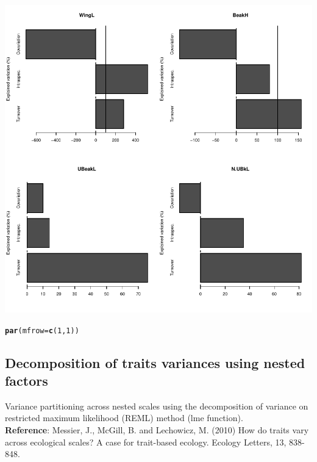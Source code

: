 \documentclass[12pt]{article}\usepackage[]{graphicx}\usepackage[]{color}
\makeatletter
\def\maxwidth{ %
  \ifdim\Gin@nat@width>\linewidth
    \linewidth
  \else
    \Gin@nat@width
  \fi
}
\newcommand{\hlnum}[1]{\textcolor[rgb]{0.686,0.059,0.569}{#1}}%
\newcommand{\hlstd}[1]{\textcolor[rgb]{0.345,0.345,0.345}{#1}}%
\newcommand{\hlkwc}[1]{\textcolor[rgb]{0.333,0.667,0.333}{#1}}%
\newcommand{\hlkwd}[1]{\textcolor[rgb]{0.737,0.353,0.396}{\textbf{#1}}}%
\newenvironment{kframe}{%
 \def\at@end@of@kframe{}%
 \ifinner\ifhmode%
  \def\at@end@of@kframe{\end{minipage}}%
  \begin{minipage}{\columnwidth}%
 \fi\fi%
 \def\FrameCommand##1{\hskip\@totalleftmargin \hskip-\fboxsep
 \colorbox{shadecolor}{##1}\hskip-\fboxsep
     \hskip-\linewidth \hskip-\@totalleftmargin \hskip\columnwidth}%
 \MakeFramed {\advance\hsize-\width
   \@totalleftmargin\z@ \linewidth\hsize
   \@setminipage}}%
 {\par\unskip\endMakeFramed%
 \at@end@of@kframe}
\newenvironment{knitrout}{}{} %
\makeatother
\begin{document}
\begin{knitrout}
{\centering \includegraphics[width=\maxwidth]{figure/unnamed-chunk-222} 

}


\begin{kframe}\begin{alltt}
\hlkwd{par}\hlstd{(}\hlkwc{mfrow}\hlstd{=}\hlkwd{c}\hlstd{(}\hlnum{1}\hlstd{,}\hlnum{1}\hlstd{))}
\end{alltt}
\end{kframe}
\end{knitrout}

\newpage

\subsection{Decomposition of traits variances using nested factors}

Variance partitioning across nested scales using the decomposition of variance on restricted maximum likelihood (REML) method (lme function).
\\

\textbf{Reference}: Messier, J., McGill, B. and Lechowicz, M. (2010) How do traits vary across ecological scales? A case for trait-based ecology. Ecology Letters, 13, 838-848.
\end{document}
